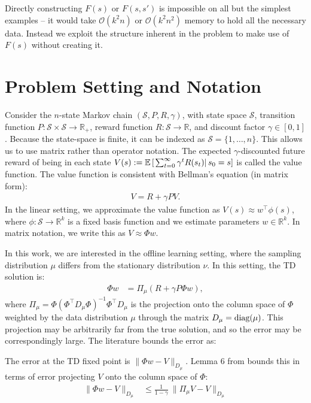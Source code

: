 Directly constructing $F(s)$ or $F(s, s')$ is impossible on all but the simplest examples -- it would take $\mathcal O(k^2n)$ or $\mathcal O(k^2n^2)$ memory to hold all the necessary data. Instead we exploit the structure inherent in the problem to make use of $F(s)$ without creating it.



\section{Problem Setting and Notation }

Consider the $n$-state Markov chain $(\mathcal S, P, R, \gamma)$, with state space $\mathcal S$, transition function $P : \mathcal{S} \times \mathcal{S} \to \mathbb{R}_+$, reward function $R : \mathcal S \to \mathbb R$, and discount factor $\gamma \in [0, 1]$.
Because the state-space is finite, it can be indexed as $\mathcal{S} = \{1, \ldots, n\}$.
This allows us to use matrix rather than operator notation.
The expected $\gamma$-discounted future reward of being in each state $V(s) := \mathbb{E} \left[\left.\sum_{t=0}^\infty \gamma^t R(s_t) \right| s_0 = s \right]$ is called the value function.
The value function is consistent with Bellman's equation (in matrix form):
\begin{align}
  V = R + \gamma P V .
\end{align}
In the linear setting, we approximate the value function as $V(s) \approx w^\top \phi(s)$, where $\phi : \mathcal S \to \mathbb R^{k}$ is a fixed basis function and we estimate parameters $w \in \mathbb R^k$. In matrix notation, we write this as $V \approx \Phi w$.

In this work, we are interested in the offline learning setting, where the sampling distribution $\mu$ differs from the stationary distribution $\nu$.
In this setting, the TD solution is:
\begin{align}
  \Phi w & = \Pi_{\mu} (R + \gamma P \Phi w) ,
\end{align}
where $\Pi_\mu = \Phi(\Phi^\top D_{\mu} \Phi)^{-1}\Phi^\top D_{\mu}$ is the projection onto the column space of $\Phi$ weighted by the data distribution $\mu$ through the matrix $D_{\mu} = \text{diag}(\mu)$. This projection may be arbitrarily far from the true solution, and so the error may be correspondingly large. The literature bounds the error as:
\begin{theorem}
  The error at the TD fixed point is $\|\Phi w - V \|_{D_\mu}$. Lemma 6 from \cite{tsitsiklis1996analysis} bounds this in terms of error projecting $V$ onto the column space of $\Phi$:
  \begin{align}
    \|\Phi w - V \|_{D_\mu} & \leq \frac{1}{1-\gamma} ~ \| \Pi_{\mu} V - V \|_{D_\mu}
  \end{align} \label{thm:boundTDError}
\end{theorem}

